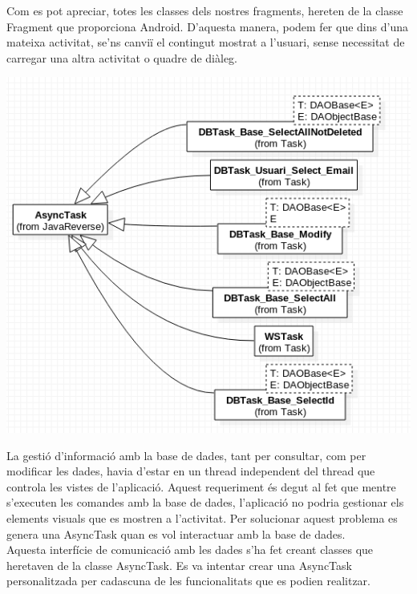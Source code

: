 \documentclass{article}
\begin{document}
	Com es pot apreciar, totes les classes dels nostres fragments, hereten de la classe Fragment que proporciona Android. D'aquesta manera, podem fer que dins d'una mateixa activitat, se'ns canviï el contingut mostrat a l'usuari, sense necessitat de carregar una altra activitat o quadre de diàleg.\\
\begin{center}
	\includegraphics[scale=0.5]{img/5.png}
	\end{center}
	La gestió d'informació amb la base de dades, tant per consultar, com per modificar les dades, havia d'estar en un thread independent del thread que controla les vistes de l'aplicació. Aquest requeriment és degut al fet que mentre s'executen les comandes amb la base de dades, l'aplicació no podria gestionar els elements visuals que es mostren a l'activitat. Per solucionar aquest problema es genera una AsyncTask quan es vol interactuar amb la base de dades.\\

Aquesta interfície de comunicació amb les dades s'ha fet creant classes que heretaven de la classe AsyncTask. Es va intentar crear una AsyncTask personalitzada per cadascuna de les funcionalitats que es podien realitzar.\\
\end{document}
